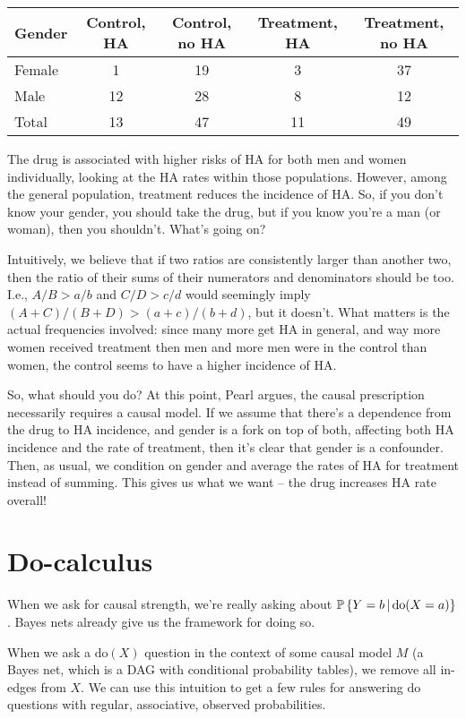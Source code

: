 \documentclass{article}
\begin{document}
\begin{table}\label{tab1}
  \centering
\begin{tabular}{lcccc}\toprule
Gender & Control, HA & Control, no HA & Treatment, HA & Treatment, no HA\\
\midrule
Female & 1 & 19 & 3 & 37 \\ 
Male & 12 & 28 & 8 & 12 \\
Total & 13 & 47 & 11 & 49 \\
\bottomrule
\end{tabular}
\end{table}

The drug is associated with higher risks of HA for both men and women individually, looking at the HA rates within those populations. However, among the general population, treatment reduces the incidence of HA. So, if you don't know your gender, you should take the drug, but if you know you're a man (or woman), then you shouldn't. What's going on?

Intuitively, we believe that if two ratios are consistently larger than another two, then the ratio of their sums of their numerators and denominators should be too. I.e., $A/B>a/b$ and $C/D>c/d$ would seemingly imply $(A+C)/(B+D)>(a+c)/(b+d)$, but it doesn't. What matters is the actual frequencies involved: since many more get HA in general, and way more women received treatment then men and more men were in the control than women, the control seems to have a higher incidence of HA.

So, what should you do? At this point, Pearl argues, the causal prescription necessarily requires a causal model. If we assume that there's a dependence from the drug to HA incidence, and gender is a fork on top of both, affecting both HA incidence and the rate of treatment, then it's clear that gender is a confounder. Then, as usual, we condition on gender and average the rates of HA for treatment instead of summing. This gives us what we want -- the drug increases HA rate overall!

\section{Do-calculus}

When we ask for causal strength, we're really asking about $\operatorname{\mathbb{P}}\left\{ Y=b \,\middle|\, \mathrm{do}(X=a) \right\}$. Bayes nets already give us the framework for doing so.

When we ask a $\mathrm{do}(X)$ question in the context of some causal model $M$ (a Bayes net, which is a DAG with conditional probability tables), we remove all in-edges from $X$. We can use this intuition to get a few rules for answering $\mathrm{do}$ questions with regular, associative, observed probabilities.
\end{document}
